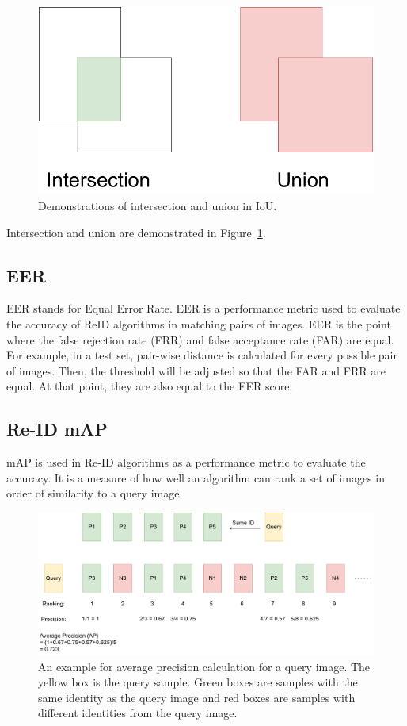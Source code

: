 \documentclass[../main.tex]{subfiles}
\begin{document}
\begin{figure}[h!]
\centering
\includegraphics[width=0.6\linewidth]{Figure/IOU.pdf}
\caption{Demonstrations of intersection and union in IoU.}
\label{fig:iou}
\end{figure}

Intersection and union are demonstrated in Figure~\ref{fig:iou}.

\subsection{EER}
\label{metric:eer}
EER stands for Equal Error Rate. EER is a performance metric used to evaluate the accuracy of ReID algorithms in matching pairs of images. EER is the point where the false rejection rate (FRR) and false acceptance rate (FAR) are equal. For example, in a test set, pair-wise distance is calculated for every possible pair of images. Then, the threshold will be adjusted so that the FAR and FRR are equal. At that point, they are also equal to the EER score.

\subsection{Re-ID mAP}
\label{metric:reid_map}
mAP is used in Re-ID algorithms as a performance metric to evaluate the accuracy. It is a measure of how well an algorithm can rank a set of images in order of similarity to a query image.

\begin{figure}[h!]
\centering
\includegraphics[width=\linewidth]{Figure/reid_map.pdf}
\caption{An example for average precision calculation for a query image. The yellow box is the query sample. Green boxes are samples with the same identity as the query image and red boxes are samples with different identities from the query image.}
\label{fig:reid_map}
\end{figure}
\end{document}
